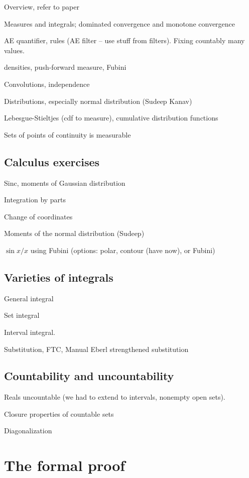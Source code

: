 \documentclass{svjour3}
\begin{document}
Overview, refer to paper

Measures and integrals; dominated convergence and monotone convergence

AE quantifier, rules (AE filter -- use stuff from filters). Fixing countably many values.

densities, push-forward measure, Fubini

Convolutions, independence

Distributions, especially normal distribution (Sudeep Kanav)

Lebesgue-Stieltjes (cdf to measure), cumulative distribution functions

Sets of points of continuity is measurable

\subsection{Calculus exercises}

Sinc, moments of Gaussian distribution

Integration by parts

Change of coordinates

Moments of the normal distribution (Sudeep)

$\sin x / x$ using Fubini (options: polar, contour (have now), or Fubini)

\subsection{Varieties of integrals}

General integral

Set integral

Interval integral.

Substitution, FTC, Manual Eberl strengthened substitution

\subsection{Countability and uncountability}

Reals uncountable (we had to extend to intervals, nonempty open sets).

Closure properties of countable sets

Diagonalization 


\section{The formal proof}
\label{section:formal}
\end{document}
